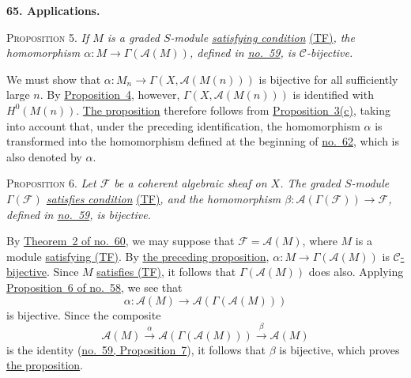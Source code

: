 
\label{fac:III:3:no:65}
\textbf{65. Applications.}

\label{fac:III:3:no:65:prop:5}
\textsc{Proposition 5.} \textit{If $M$ is a graded $S$-module
\hyperref[fac:III:2:no:56:def:TF]{satisfying condition}}
\hyperref[fac:III:2:no:56:def:TF]{(TF)}\textit{, the homomorphism
$\alpha:M\to\Gamma(\mathcal{A}(M))$, defined in
\hyperref[fac:III:2:no:59:def:alpha]{no.~59}, is
$\mathcal{C}$-bijective.}

We must show that
$\alpha:M_n\to\Gamma(X,\mathcal{A}(M(n)))$ is bijective for all
sufficiently large $n$. By
\hyperref[fac:III:3:no:64:prop:4]{Proposition~4}, however,
$\Gamma(X,\mathcal{A}(M(n)))$ is identified with $H^0(M(n))$.
\hyperref[fac:III:3:no:65:prop:5]{The proposition} therefore follows from
\hyperref[fac:III:3:no:63:prop:3:item:c]{Proposition~3(c)}, taking into
account that, under the preceding identification, the homomorphism
$\alpha$ is transformed into the homomorphism defined at the beginning of
\hyperref[fac:III:3:no:62:def:alpha]{no.~62}, which is also denoted by
$\alpha$.

\label{fac:III:3:no:65:prop:6}
\textsc{Proposition 6.} \textit{Let $\mathcal{F}$ be a coherent algebraic
sheaf on $X$. The graded $S$-module $\Gamma(\mathcal{F})$
\hyperref[fac:III:2:no:56:def:TF]{satisfies condition}}
\hyperref[fac:III:2:no:56:def:TF]{(TF)}\textit{, and the homomorphism
$\beta:\mathcal{A}(\Gamma(\mathcal{F}))\to\mathcal{F}$, defined in
\hyperref[fac:III:2:no:59:def:beta]{no.~59}, is bijective.}

By \hyperref[fac:III:2:no:60:theorem:2]{Theorem~2 of no.~60}, we may
suppose that $\mathcal{F}=\mathcal{A}(M)$, where $M$ is a module
\hyperref[fac:III:2:no:56:def:TF]{satisfying (TF)}. By
\hyperref[fac:III:3:no:65:prop:5]{the preceding proposition},
$\alpha:M\to\Gamma(\mathcal{A}(M))$ is
\hyperref[fac:III:2:no:56:def:C-morphism]{$\mathcal{C}$-bijective}. Since
$M$ \hyperref[fac:III:2:no:56:def:TF]{satisfies (TF)}, it follows that
$\Gamma(\mathcal{A}(M))$ does also. Applying
\hyperref[fac:III:2:no:58:prop:6]{Proposition~6 of no.~58}, we see that
\[
\alpha:\mathcal{A}(M)\longrightarrow
\mathcal{A}(\Gamma(\mathcal{A}(M)))
\]
is bijective. Since the composite
\label{fac:III:3:no:65:formula:alpha-beta-composite}
\[
\mathcal{A}(M)\xrightarrow{\ \alpha\ }
\mathcal{A}(\Gamma(\mathcal{A}(M)))
\xrightarrow{\ \beta\ }\mathcal{A}(M)
\]
is the identity
(\hyperref[fac:III:2:no:59:prop:7]{no.~59, Proposition~7}), it follows that
$\beta$ is bijective, which proves
\hyperref[fac:III:3:no:65:prop:6]{the proposition}.

